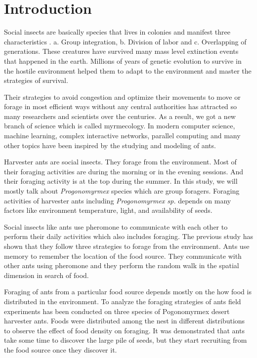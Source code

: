 \chapter{Introduction}
Social insects are basically species that lives in colonies and manifest three characteristics \cite{SocialInsect}. a. Group integration\cite{anderson2001individual}, b. Division of labor\cite{beshers2001models} and c. Overlapping of generations\cite{wilson2005eusociality}. These creatures have survived many mass level extinction events that happened in the earth. Millions of years of genetic evolution to survive in the hostile environment helped them to adapt to the environment and master the strategies of survival.  \par
Their strategies to avoid congestion and optimize their movements to move or forage in most efficient ways without any central authorities has attracted so many researchers and scientists over the centuries\cite{narzt2010self}. As a result, we got a new branch of science which is called myrmecology. In modern computer science, machine learning\cite{dorigo1997ant}, complex interactive networks\cite{he2011ant}, parallel computing\cite{bonabeau2000inspiration} and many other topics have been inspired by the studying and modeling of ants. \par
Harvester ants are social insects. They forage from the environment. Most of their foraging activities are during the morning or in the evening sessions. And their foraging activity is at the top during the summer\cite{hobbs1985harvester, whitford1975factors}.  In this study, we will mostly talk about \textit{Progonomyrmex} species which are group foragers\cite{whitford1978foraging}. Foraging activities of harvester ants including \textit{Progonomyrmex sp.} depends on many factors like environment temperature, light, and availability of seeds\cite{whitford1975factors}.\par 
Social insects like ants use pheromone to communicate with each other to perform their daily activities which also includes foraging\cite{jackson2006communication}.
  The previous study has shown that they follow three strategies to forage from the environment\cite{flanagan2012quantifying}. Ants use memory to remember the location of the food source. They communicate with other ants using pheromone and they perform the random walk in the spatial dimension in search of food.\par 
  Foraging of ants from a particular food source depends mostly on the how  food is distributed in the environment\cite{traniello1989foraging}. To analyze the foraging strategies of ants field experiments has been conducted on three species of Pogonomyrmex desert harvester ants. Foods were distributed among the nest in different distributions to observe the effect of food density on foraging. It was demonstrated that ants take some time to discover the large pile of seeds, but they start recruiting from the food source once they discover it\cite{flanagan2012quantifying}. 

